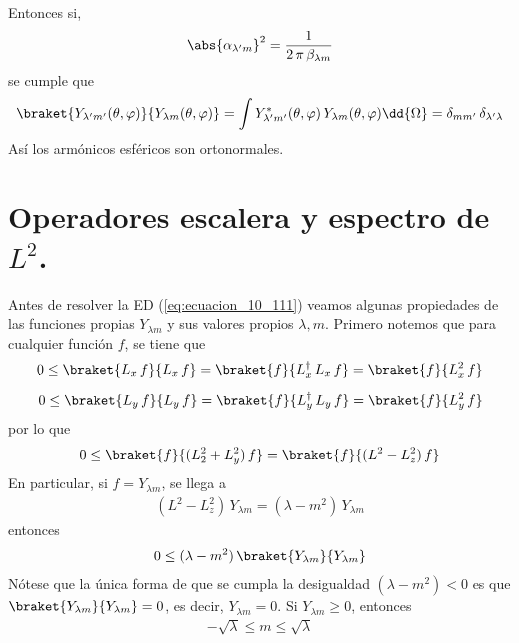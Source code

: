 Entonces si,
\begin{align}
\abs{\alpha_{\lambda^{\prime} m}}^{2} = \dfrac{1}{2 \, \pi \, \beta_{\lambda m}}
\label{eq:ecuacion_10_126}
\end{align}
se cumple que
\begin{align}
\braket{Y_{\lambda^{\prime} m^{\prime}}(\theta, \varphi)}{Y_{\lambda m}(\theta, \varphi)} = \int Y_{\lambda^\prime m^{\prime}}^{*} (\theta, \varphi) \, Y_{\lambda m} (\theta, \varphi) \dd{\Omega} = \delta_{m m^{\prime}} \, \delta_{\lambda^{\prime} \lambda}
\label{eq:ecuacion_10_127}
\end{align}
Así los armónicos esféricos son ortonormales.
\section{Operadores escalera y espectro de \texorpdfstring{$L^{2}$}{L2}.}
Antes de resolver la ED (\ref{eq:ecuacion_10_111}) veamos algunas propiedades de las funciones propias $Y_{\lambda m}$ y sus valores propios $\lambda, m$. Primero notemos que para cualquier función $f$, se tiene que
\begin{align*}
0 \leq \braket{L_{x} \, f}{L_{x} \, f} = \braket{f}{L_{x}^{\dagger} \, L_{x} \, f} = \braket{f}{L_{x}^{2} \, f} \\[0.5em]
0 \leq \braket{L_{y} \, f}{L_{y} \, f} = \braket{f}{L_{y}^{\dagger} \, L_{y} \, f} = \braket{f}{L_{y}^{2} \, f}
\end{align*}
por lo que
\begin{align*}
0 \leq \braket{f}{(L_{2}^{2} + L_{y}^{2}) \, f} = \braket{f}{(L^{2} - L_{z}^{2}) \, f}
\end{align*}
En particular, si $f = Y_{\lambda m}$, se llega a
\begin{align}
(L^{2} - L_{z}^{2}) \, Y_{\lambda m} = (\lambda - m^{2}) \, Y_{\lambda m}
\label{eq:ecuacion_10_128}
\end{align}
entonces
\begin{align}
0 \leq (\lambda - m^{2}) \, \braket{Y_{\lambda m}}{Y_{\lambda m}}
\label{eq:ecuacion_10_129}
\end{align}
Nótese que la única forma de que se cumpla la desigualdad $(\lambda - m^{2}) < 0$ es que $\braket{Y_{\lambda m}}{Y_{\lambda m}} = 0$, es decir, $Y_{\lambda m} = 0$. Si $Y_{\lambda m} \geq 0$, entonces
\begin{align}
- \sqrt{\lambda} \leq m \leq \sqrt{\lambda}
\label{eq:ecuacion_10_130}
\end{align}                                                   
